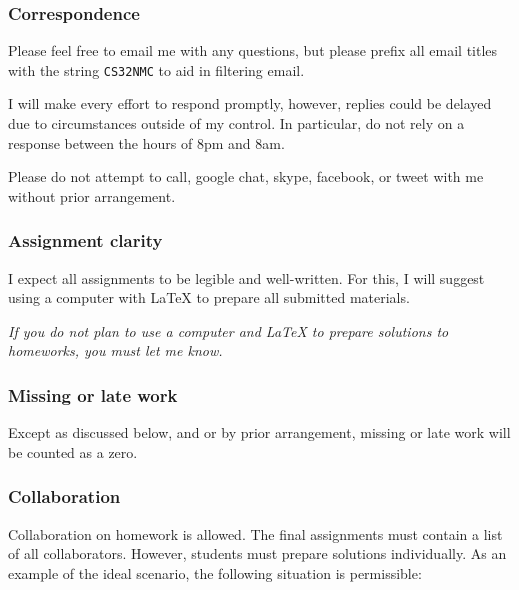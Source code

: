 \documentclass{article}
\begin{document}
\hypertarget{correspondence_16}{}\subsubsection*{{Correspondence}}\label{correspondence_16}

Please feel free to email me with any questions, but please prefix all email titles with the string {\colorbox[rgb]{1.00,0.93,1.00}{\tt CS\char32NMC}} to aid in filtering email.

I will make every effort to respond promptly, however, replies could be delayed due to circumstances outside of my control. In particular, do not rely on a response between the hours of 8pm and 8am.

Please do not attempt to call, google chat, skype, facebook, or tweet with me without prior arrangement.

\hypertarget{assignment_clarity_17}{}\subsubsection*{{Assignment clarity}}\label{assignment_clarity_17}

I expect all assignments to be legible and well-written. For this, I will suggest using a computer with \LaTeX\xspace  to prepare all submitted materials.

\emph{If you do not plan to use a computer and \LaTeX\xspace  to prepare solutions to homeworks, you must let me know.}

\hypertarget{missing_or_late_work_18}{}\subsubsection*{{Missing or late work}}\label{missing_or_late_work_18}

Except as discussed below, and or by prior arrangement, missing or late work will be counted as a zero.

\hypertarget{collaboration_19}{}\subsubsection*{{Collaboration}}\label{collaboration_19}

Collaboration on homework is allowed. The final assignments must contain a list of all collaborators. However, students must prepare solutions individually. As an example of the ideal scenario, the following situation is permissible:
\end{document}
